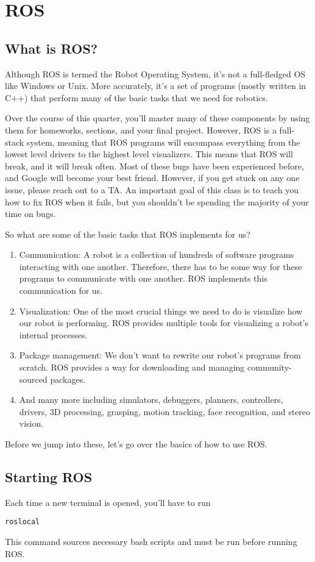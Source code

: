 \section{ROS}
\subsection{What is ROS?}
Although ROS is termed the Robot Operating System, it's not a full-fledged OS like Windows or Unix. More accurately, it's a set of programs (mostly written in C++) that perform many of the basic tasks that we need for robotics. 

Over the course of this quarter, you'll master many of these components by using them for homeworks, sections, and your final project. However, ROS is a full-stack system, meaning that ROS programs will encompass everything from the lowest level drivers to the highest level visualizers. This means that ROS will break, and it will break often. Most of these bugs have been experienced before, and Google will become your best friend. However, if you get stuck on any one issue, please reach out to a TA. An important goal of this class is to teach you how to fix ROS when it fails, but you shouldn't be spending the majority of your time on bugs. 

So what are some of the basic tasks that ROS implements for us?
\begin{enumerate}
\item Communication: A robot is a collection of hundreds of software programs interacting with one another. Therefore, there has to be some way for these programs to communicate with one another. ROS implements this communication for us.
\item Visualization: One of the most crucial things we need to do is visualize how our robot is performing. ROS provides multiple tools for visualizing a robot's internal processes.
\item Package management: We don't want to rewrite our robot's programs from scratch. ROS provides a way for downloading and managing community-sourced packages.
\item And many more including simulators, debuggers, planners, controllers, drivers, 3D processing, grasping, motion tracking, face recognition, and stereo vision.
\end{enumerate}

Before we jump into these, let's go over the basics of how to use ROS.
\subsection{Starting ROS}
Each time a new terminal is opened, you'll have to run
\begin{lstlisting}
roslocal
\end{lstlisting}
This command sources necessary bash scripts and must be run before running ROS.

